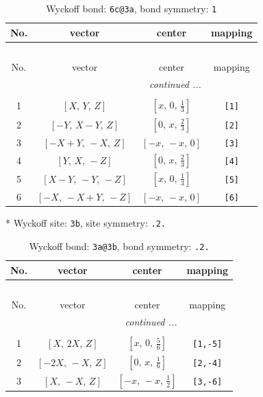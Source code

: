 \documentclass[fleqn,8pt]{jsarticle}
\begin{document}
\renewcommand{\arraystretch}{1.2}
\begin{longtable}{cccc}
\caption{Wyckoff bond: {\tt 6c@3a}, bond symmetry: {\tt 1}}
 \\
 \hline \hline
No. & vector & center & mapping \\ \hline \endfirsthead

\multicolumn{3}{l}{\tablename\ \thetable{}} \\
 \hline \hline
No. & vector & center & mapping \\ \hline \endhead

 \hline \hline
\multicolumn{3}{r}{\footnotesize\it continued ...} \\ \endfoot

 \hline \hline
\multicolumn{3}{r}{} \\ \endlastfoot

1 & $\left[ X,\, Y,\, Z \right]$ & $\left[ x,\, 0,\, \frac{1}{3} \right]$ & {\tt [1]} \\ \hline
2 & $\left[ - Y,\, X - Y,\, Z \right]$ & $\left[ 0,\, x,\, \frac{2}{3} \right]$ & {\tt [2]} \\ \hline
3 & $\left[ - X + Y,\, - X,\, Z \right]$ & $\left[ - x,\, - x,\, 0 \right]$ & {\tt [3]} \\ \hline
4 & $\left[ Y,\, X,\, - Z \right]$ & $\left[ 0,\, x,\, \frac{2}{3} \right]$ & {\tt [4]} \\ \hline
5 & $\left[ X - Y,\, - Y,\, - Z \right]$ & $\left[ x,\, 0,\, \frac{1}{3} \right]$ & {\tt [5]} \\ \hline
6 & $\left[ - X,\, - X + Y,\, - Z \right]$ & $\left[ - x,\, - x,\, 0 \right]$ & {\tt [6]} \\
\end{longtable}
* Wyckoff site: {\tt 3b}, site symmetry: {\tt .2.}
\renewcommand{\arraystretch}{1.2}
\begin{longtable}{cccc}
\caption{Wyckoff bond: {\tt 3a@3b}, bond symmetry: {\tt .2.}}
 \\
 \hline \hline
No. & vector & center & mapping \\ \hline \endfirsthead

\multicolumn{3}{l}{\tablename\ \thetable{}} \\
 \hline \hline
No. & vector & center & mapping \\ \hline \endhead

 \hline \hline
\multicolumn{3}{r}{\footnotesize\it continued ...} \\ \endfoot

 \hline \hline
\multicolumn{3}{r}{} \\ \endlastfoot

1 & $\left[ X,\, 2 X,\, Z \right]$ & $\left[ x,\, 0,\, \frac{5}{6} \right]$ & {\tt [1,-5]} \\ \hline
2 & $\left[ - 2 X,\, - X,\, Z \right]$ & $\left[ 0,\, x,\, \frac{1}{6} \right]$ & {\tt [2,-4]} \\ \hline
3 & $\left[ X,\, - X,\, Z \right]$ & $\left[ - x,\, - x,\, \frac{1}{2} \right]$ & {\tt [3,-6]} \\
\end{longtable}
\end{document}
